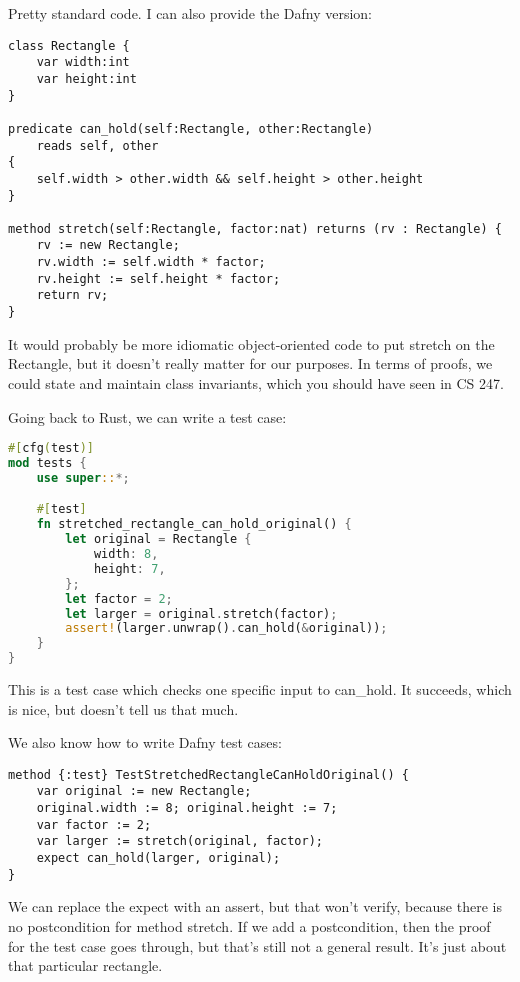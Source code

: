 \documentclass[11pt]{article}
\begin{document}
Pretty standard code. I can also provide the Dafny version:

\begin{lstlisting}[language=dafny]
class Rectangle {
    var width:int
    var height:int
}

predicate can_hold(self:Rectangle, other:Rectangle)
    reads self, other
{
    self.width > other.width && self.height > other.height
}

method stretch(self:Rectangle, factor:nat) returns (rv : Rectangle) {
    rv := new Rectangle;
    rv.width := self.width * factor;
    rv.height := self.height * factor;
    return rv;
}
\end{lstlisting}
It would probably be more idiomatic object-oriented code to put \textsf{stretch}
on the \textsf{Rectangle}, but it doesn't really matter for our purposes.
In terms of proofs, we could state and maintain class invariants, which you should
have seen in CS 247.

Going back to Rust, we can write a test case:
\begin{lstlisting}[language=Rust]
#[cfg(test)]
mod tests {
    use super::*;

    #[test]
    fn stretched_rectangle_can_hold_original() {
        let original = Rectangle {
            width: 8,
            height: 7,
        };
        let factor = 2;
        let larger = original.stretch(factor);
        assert!(larger.unwrap().can_hold(&original));
    }
}
\end{lstlisting}
This is a test case which checks one specific input to \textsf{can\_hold}.
It succeeds, which is nice, but doesn't tell us that much.

We also know how to write Dafny test cases:
\begin{lstlisting}[language=dafny]
method {:test} TestStretchedRectangleCanHoldOriginal() {
    var original := new Rectangle;
    original.width := 8; original.height := 7;
    var factor := 2;
    var larger := stretch(original, factor);
    expect can_hold(larger, original);
}
\end{lstlisting}

We can replace the \textsf{expect} with an \textsf{assert}, but that won't
verify, because there is no postcondition for method \textsf{stretch}.
If we add a postcondition, then the proof for the test case goes through,
but that's still not a general result. It's just about that particular rectangle.
\end{document}
